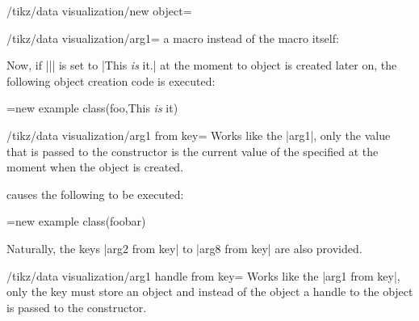 \begin{key}{/tikz/data visualization/new object=}
\begin{key}{/tikz/data visualization/arg1=}
    a macro instead of the macro itself:
\begin{codeexample}
\end{codeexample}
  Now, if |\bar| is set to |This \emph{is} it.| at the moment to
  object is created later on, the following object creation code is executed:
\begin{codeexample}
\pgfoonew \tikzdvobj=new example class(foo,This \emph{is} it)
\end{codeexample}
  \end{key}
  
  \begin{key}{/tikz/data visualization/arg1 from key=}
    Works like the |arg1|, only the value that is passed to the
    constructor is the current value of the specified  at
    the moment when the object is created.
\begin{codeexample}
\tikzset{some key/.initial=foobar}
\end{codeexample}
  causes the following to be executed:
\begin{codeexample}
\pgfoonew \tikzdvobj=new example class(foobar)
\end{codeexample}
    Naturally, the keys |arg2 from key| to |arg8 from key| are also
    provided. 
  \end{key}

  \begin{key}{/tikz/data visualization/arg1 handle from key=}
    Works like the |arg1 from key|, only the key must store an object
    and instead of the object a handle to the object is passed to the
    constructor.
  \end{key}
\end{key}

